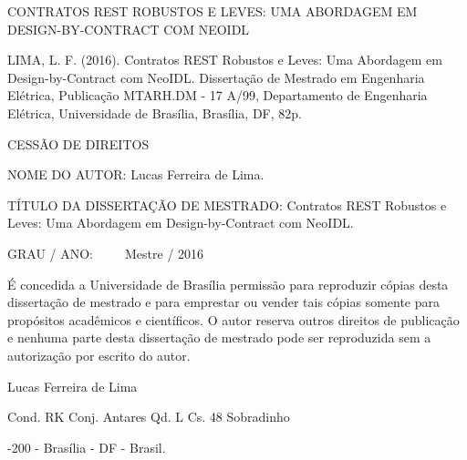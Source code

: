 \vspace{-1mm}

\noindent CONTRATOS REST ROBUSTOS E LEVES: UMA ABORDAGEM EM
DESIGN-BY-CONTRACT COM NEOIDL

\noindent  LIMA, L. F. (2016). Contratos REST Robustos e Leves: Uma
Abordagem em Design-by-Contract com NeoIDL. Dissertação de Mestrado em
Engenharia Elétrica, Publicação MTARH.DM - 17 A/99, Departamento de Engenharia Elétrica,
Universidade de Brasília, Brasília, DF, 82p.



\vspace{6mm}

\noindent \begin{bf} \MakeUppercase{Cessão de Direitos} \end{bf}

\vspace{5mm}

\noindent NOME DO AUTOR: Lucas Ferreira de Lima.
\vspace{6mm}

\noindent TÍTULO DA DISSERTAÇÃO DE MESTRADO: Contratos REST Robustos e Leves: Uma
Abordagem em Design-by-Contract com NeoIDL. 

\vspace{3mm}
\noindent GRAU / ANO:~ ~ ~ Mestre / 2016

\vspace{5mm}

\noindent É concedida a Universidade de Brasília permissão para reproduzir
cópias desta dissertação de mestrado e para emprestar ou vender tais cópias
somente para propósitos acadêmicos e científicos. O autor reserva outros
direitos de publicação e nenhuma parte desta dissertação de mestrado pode ser
reproduzida sem a autorização por escrito do autor.

\vspace{5mm}

\noindent \underline{\hspace{65mm}}

\vspace{-2mm}

\noindent  Lucas Ferreira de Lima
   \vspace{-2mm}

\noindent Cond. RK Conj. Antares Qd. L Cs. 48 Sobradinho 
    \vspace{-2mm}
    
-200 - Brasília - DF - Brasil.

\pagebreak


